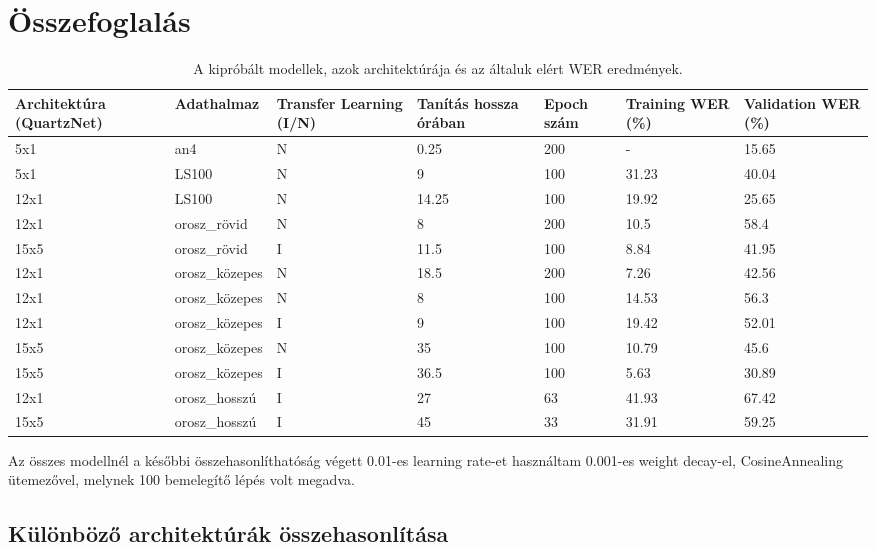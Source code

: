 \chapter{Összefoglalás}

\begin{table}[ht]
	\footnotesize
	\centering
	\begin{tabular}{ p{2.5cm} p{2.5cm} p{1.5cm} p{1.5cm} p{1cm} p{1.5cm} p{1.5cm} }
		\toprule
		\textbf{Architektúra (QuartzNet)} & \textbf{Adathalmaz} & \textbf {Transfer Learning (I/N)} & \textbf{Tanítás hossza órában} & \textbf{Epoch szám} & \textbf{Training WER (\%)} & \textbf{Validation WER (\%)} \\
		\midrule
		5x1 & an4 & N & 0.25 & 200 & - & 15.65 \\
		\hline
		5x1 & LS100 & N & 9 & 100 & 31.23 & 40.04 \\
		\hline
		12x1 & LS100 & N & 14.25 & 100 & 19.92 & 25.65 \\
		\hline
		\hline
		12x1 & orosz\_rövid & N & 8 & 200 & 10.5 & 58.4 \\
		\hline
		15x5 & orosz\_rövid & I & 11.5 & 100 & 8.84 & 41.95 \\
		\hline
		12x1 & orosz\_közepes & N & 18.5 & 200 & 7.26 & 42.56 \\
		\hline
		12x1 & orosz\_közepes & N & 8 & 100 & 14.53 & 56.3 \\
		\hline
		12x1 & orosz\_közepes & I & 9 & 100 & 19.42 & 52.01 \\
		\hline
		15x5 & orosz\_közepes & N & 35 & 100 & 10.79 & 45.6 \\
		\hline
		15x5 & orosz\_közepes & I & 36.5 & 100 & 5.63 & 30.89 \\
		\hline
		12x1 & orosz\_hosszú & I & 27 & 63 & 41.93 & 67.42 \\
		\hline
		15x5 & orosz\_hosszú & I & 45 & 33 & 31.91 & 59.25 \\
		\bottomrule
	\end{tabular}
	\caption{A kipróbált modellek, azok architektúrája és az általuk elért WER eredmények.}
\end{table}

Az összes modellnél a későbbi összehasonlíthatóság végett 0.01-es learning rate-et használtam 0.001-es weight decay-el, CosineAnnealing ütemezővel, melynek 100 bemelegítő lépés volt megadva.

\section{Különböző architektúrák összehasonlítása}

